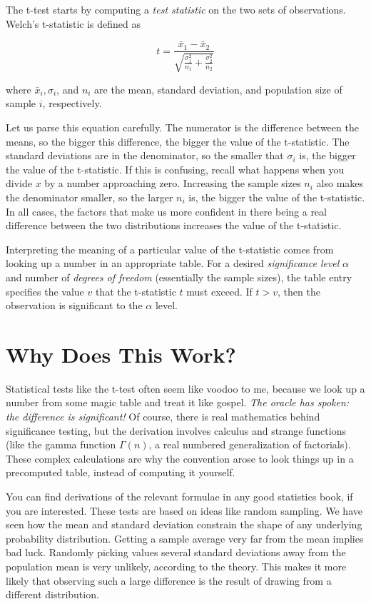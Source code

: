 \documentclass[10pt]{article}
\begin{document}
The t-test starts by computing a \textit{test statistic} on the two sets of observations. Welch's t-statistic is defined as

\[
    t = \frac{\bar{x}_{1} - \bar{x}_{2}}{\sqrt{\frac{\sigma_{1}^{2}}{n_{1}} + \frac{\sigma_{2}^{2}}{n_{2}}}}
\]

where $\bar{x}_{i}, \sigma_{i}$, and $n_{i}$ are the mean, standard deviation, and population size of sample $i$, respectively.

Let us parse this equation carefully. The numerator is the difference between the means, so the bigger this difference, the bigger the value of the t-statistic. The standard deviations are in the denominator, so the smaller that $\sigma_{i}$ is, the bigger the value of the t-statistic. If this is confusing, recall what happens when you divide $x$ by a number approaching zero. Increasing the sample sizes $n_{i}$ also makes the denominator smaller, so the larger $n_{i}$ is, the bigger the value of the t-statistic. In all cases, the factors that make us more confident in there being a real difference between the two distributions increases the value of the t-statistic.

Interpreting the meaning of a particular value of the t-statistic comes from looking up a number in an appropriate table. For a desired \textit{significance level} $\alpha$ and number of \textit{degrees of freedom} (essentially the sample sizes), the table entry specifies the value $v$ that the t-statistic $t$ must exceed. If $t > v$, then the observation is significant to the $\alpha$ level.

\section*{Why Does This Work?}
Statistical tests like the t-test often seem like voodoo to me, because we look up a number from some magic table and treat it like gospel. \textit{The oracle has spoken: the difference is significant!} Of course, there is real mathematics behind significance testing, but the derivation involves calculus and strange functions (like the gamma function $\Gamma(n)$, a real numbered generalization of factorials). These complex calculations are why the convention arose to look things up in a precomputed table, instead of computing it yourself.

You can find derivations of the relevant formulae in any good statistics book, if you are interested. These tests are based on ideas like random sampling. We have seen how the mean and standard deviation constrain the shape of any underlying probability distribution. Getting a sample average very far from the mean implies bad luck. Randomly picking values several standard deviations away from the population mean is very unlikely, according to the theory. This makes it more likely that observing such a large difference is the result of drawing from a different distribution.
\end{document}
